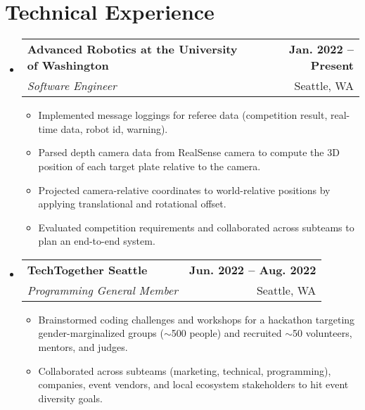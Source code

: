 \documentclass[letterpaper,11pt]{article}
\begin{document}
\section{Technical Experience}
\begin{itemize}[nosep,label={},leftmargin=0in]

  \item
  \begin{tabularx}{\textwidth}{Xr@{}}
    \textbf{Advanced Robotics at the University of Washington} & \textbf{Jan. 2022 -- Present} \\
    \textit{Software Engineer} & Seattle, WA
  \end{tabularx}
  \begin{itemize}[nosep]
    \item \small{Implemented message loggings for referee data (competition result, real-time data, robot id, warning).}
    \item \small{Parsed depth camera data from RealSense camera to compute the 3D position of each target plate relative to the camera.}
    \item \small{Projected camera-relative coordinates to world-relative positions by applying translational and rotational offset.}
    \item \small{Evaluated competition requirements and collaborated across subteams to plan an end-to-end system.}
  \end{itemize}

  \item
  \begin{tabularx}{\textwidth}{Xr@{}}
    \textbf{TechTogether Seattle} & \textbf{Jun. 2022 -- Aug. 2022} \\
    \textit{Programming General Member} & Seattle, WA
  \end{tabularx}
  \begin{itemize}[nosep]
    \item \small{Brainstormed coding challenges and workshops for a hackathon targeting gender-marginalized groups ($\sim$500 people) and recruited $\sim$50 volunteers, mentors, and judges.}
    \item \small{Collaborated across subteams (marketing, technical, programming), companies, event vendors, and local ecosystem stakeholders to hit event diversity goals.}
  \end{itemize}


\end{itemize}
\end{document}
